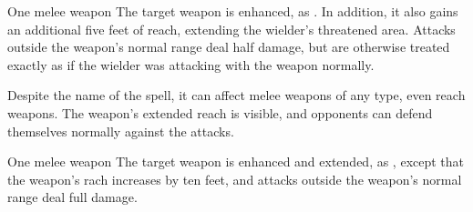 \spelldur{\durshort}
\begin{spelltarget}{One melee weapon}
    \spelleffect The target weapon is enhanced, as . In addition, it also gains an additional five feet of reach, extending the wielder's threatened area. Attacks outside the weapon's normal range deal half damage, but are otherwise treated exactly as if the wielder was attacking with the weapon normally.
\end{spelltarget}
\spellnotes Despite the name of the spell, it can affect melee weapons of any type, even reach weapons. The weapon's extended reach is visible, and opponents can defend themselves normally against the attacks.

\spelldur{\durshort}
\begin{spelltarget}{One melee weapon}
    \spelleffect The target weapon is enhanced and extended, as , except that the weapon's rach increases by ten feet, and attacks outside the weapon's normal range deal full damage.
\end{spelltarget}

